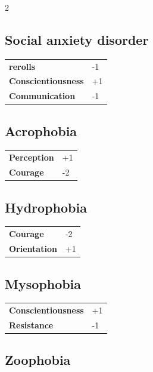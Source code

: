 \begin{multicols}{2}
    \subsection*{Social anxiety disorder}




    \begin{tabular}{@{}ll@{}}
        \textbf{rerolls} & -1\\
        \textbf{Conscientiousness} & +1\\
        \textbf{Communication} & -1\\
    \end{tabular}

    \subsection*{Acrophobia}




    \begin{tabular}{@{}ll@{}}
        \textbf{Perception} & +1\\
        \textbf{Courage} & -2\\
    \end{tabular}

    \subsection*{Hydrophobia}




    \begin{tabular}{@{}ll@{}}
        \textbf{Courage} & -2\\
        \textbf{Orientation} & +1\\
    \end{tabular}

    \subsection*{Mysophobia}




    \begin{tabular}{@{}ll@{}}
        \textbf{Conscientiousness} & +1\\
        \textbf{Resistance} & -1\\
    \end{tabular}

    \subsection*{Zoophobia}





\end{multicols}
